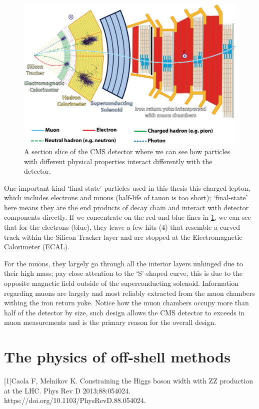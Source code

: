 \begin{figure}[htb]
\begin{center}
\includegraphics[width=.70\linewidth]{fig/CMS_Slice.png}
\end{center}
\caption{A section slice of the CMS detector where we can see how 
particles with different physical properties interact differently with the detector.}
\label{fig:CMS_Slice}
\end{figure}

One important kind `final-state' particles used in this thesis this charged lepton, 
which includes electrons and muons (half-life of tauon is too short);
`final-state' here means they are the end products of decay chain and interact with detector
components directly. If we concentrate on the red and blue lines in \ref{fig:CMS_Slice}, we
can see that for the electrons (blue), they leave a few hits (4) that resemble a curved
track within the Silicon Tracker layer and are stopped at the Electromagnetic Calorimeter
(ECAL). 

For the muons, they largely go through all the interior layers unhinged due to their
high mass; pay close attention to the `S'-shaped curve, this is due to the opposite magnetic
field outside of the superconducting solenoid. Information regarding muons are largely and 
most reliably extracted from the muon chambers withing the iron return yoke. Notice how the
muon chambers occupy more than half of the detector by size, such design allows the CMS 
detector to exceeds in muon measurements and is the primary reason for the overall design.


\section{The physics of off-shell methods}
[1]Caola F, Melnikov K. Constraining the Higgs boson width with ZZ production at the LHC. Phys Rev D 2013;88:054024. https://doi.org/10.1103/PhysRevD.88.054024.

